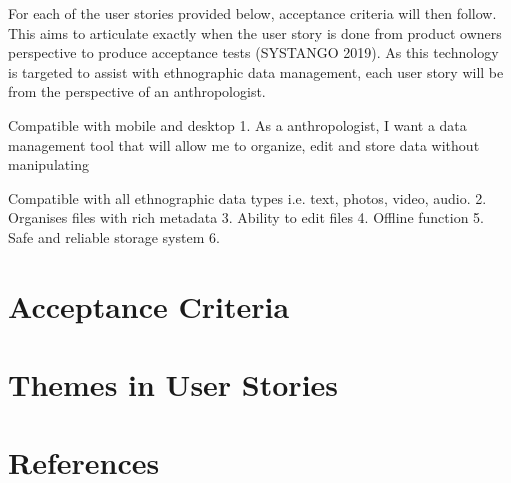 \documentclass{article}
\begin{document}
For each of the user stories provided below, acceptance criteria will then follow. This aims to articulate exactly when the user story is done from product owners perspective to produce acceptance tests (SYSTANGO 2019). As this technology is targeted to assist with ethnographic data management, each user story will be from the perspective of an anthropologist.
\clearpage



    

Compatible with mobile and desktop
1. As a anthropologist, I want a data management tool that will allow me to organize, edit and store data without manipulating 

Compatible with all ethnographic data types i.e. text, photos, video, audio.
2.
Organises files with rich metadata
3.
Ability to edit files
4.
Offline function 
5.
Safe and reliable storage system
6.




\section{Acceptance Criteria}

\section{Themes in User Stories}

\section{References}
\end{document}
